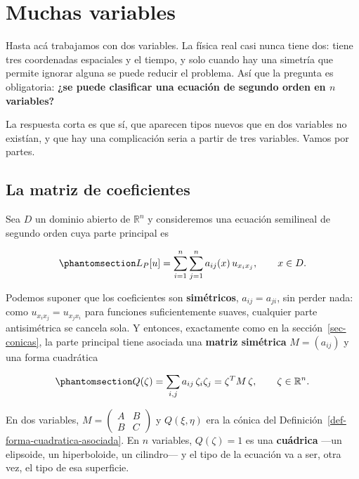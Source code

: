 \documentclass[
  spanish,
  a4paper,
]{scrbook}
\theoremstyle{definition}
\theoremstyle{plain}
\theoremstyle{definition}
\theoremstyle{plain}
\theoremstyle{definition}
\theoremstyle{remark}
\begin{document}
\section{Muchas variables}\label{sec-muchas-variables}

Hasta acá trabajamos con dos variables. La física real casi nunca tiene
dos: tiene tres coordenadas espaciales y el tiempo, y solo cuando hay
una simetría que permite ignorar alguna se puede reducir el problema.
Así que la pregunta es obligatoria: \textbf{¿se puede clasificar una
ecuación de segundo orden en \(n\) variables?}

La respuesta corta es que sí, que aparecen tipos nuevos que en dos
variables no existían, y que hay una complicación seria a partir de tres
variables. Vamos por partes.

\subsection{La matriz de coeficientes}\label{sec-matriz-n}

Sea \(D\) un dominio abierto de \(\mathbb{R}^n\) y consideremos una
ecuación semilineal de segundo orden cuya parte principal es

\begin{equation}\protect\phantomsection\label{eq-parte-principal-n}{
L_P[u] = \sum_{i=1}^{n}\sum_{j=1}^{n} a_{ij}(x)\,u_{x_ix_j}, \qquad x \in D .
}\end{equation}

Podemos suponer que los coeficientes son \textbf{simétricos},
\(a_{ij}=a_{ji}\), sin perder nada: como \(u_{x_ix_j} = u_{x_jx_i}\)
para funciones suficientemente suaves, cualquier parte antisimétrica se
cancela sola. Y entonces, exactamente como en la
sección~\ref{sec-conicas}, la parte principal tiene asociada una
\textbf{matriz simétrica} \(M = (a_{ij})\) y una forma cuadrática

\begin{equation}\protect\phantomsection\label{eq-Q-n}{
Q(\zeta) = \sum_{i,j} a_{ij}\,\zeta_i\zeta_j = \zeta^{T}M\,\zeta , \qquad \zeta \in \mathbb{R}^n .
}\end{equation}

En dos variables, \(M = \begin{pmatrix} A & B \\ B & C\end{pmatrix}\) y
\(Q(\xi,\eta)\) era la cónica del
Definición~\ref{def-forma-cuadratica-asociada}. En \(n\) variables,
\(Q(\zeta)=1\) es una \textbf{cuádrica} ---un elipsoide, un
hiperboloide, un cilindro--- y el tipo de la ecuación va a ser, otra
vez, el tipo de esa superficie.
\end{document}
